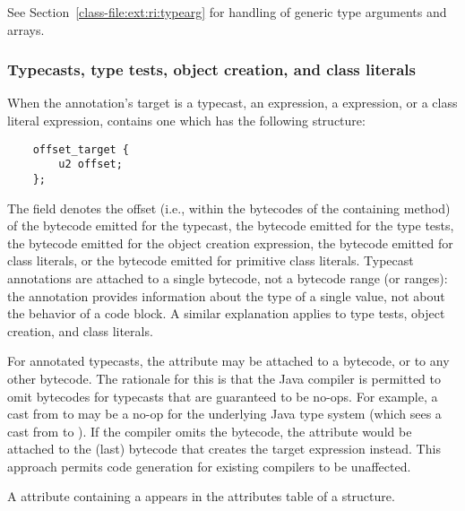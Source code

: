 \documentclass[10pt]{article}
\begin{document}

See Section~\ref{class-file:ext:ri:typearg} for handling of generic
type arguments and arrays.



\subsubsection{Typecasts, type tests, object creation, and class literals\label{class-file:ext:ri:typecast}}

When the annotation's target is a typecast, an 
expression, a  expression, or a class literal expression,
 contains one  which has the
following structure:

\begin{Verbatim}
    offset_target {
        u2 offset;
    };
\end{Verbatim}

The  field denotes the offset (i.e., within the bytecodes
of the containing method) of the  bytecode emitted for
the typecast, the  bytecode emitted for the type tests,
the  bytecode emitted for the object creation expression,
the  bytecode emitted for class literals, or the
 bytecode emitted for primitive class literals.
Typecast annotations are attached to a single bytecode, not a bytecode range
(or ranges):  the annotation provides information about the type of a
single value, not about the behavior of a code block.
A similar explanation applies to type tests, object creation, and class literals.

For annotated typecasts, the attribute may be attached to a
 bytecode, or to any other bytecode.  The rationale for
this is that the Java compiler is permitted to omit 
bytecodes for typecasts that are guaranteed to be no-ops.  For example, a
cast from  to  may be a no-op for the
underlying Java type system (which sees a cast from  to
).  If the compiler omits the  bytecode, the
 attribute would be attached to the (last) bytecode that
creates the target expression instead.  This approach permits code
generation for existing compilers to be unaffected.

A \RuntimeInOrVisibleTypeAnnotations attribute containing a
 appears in the attributes table of a
 structure.
\end{document}
